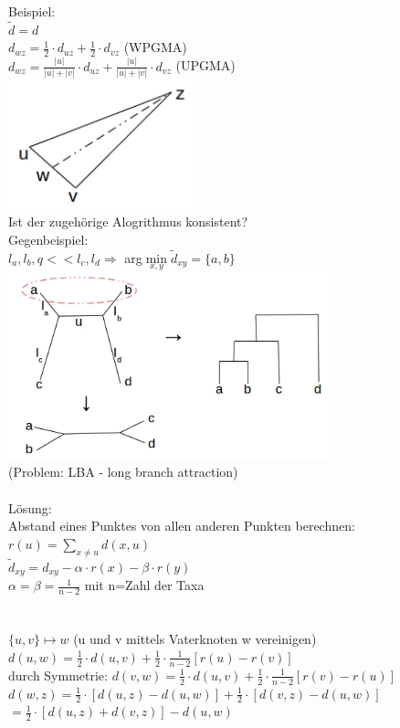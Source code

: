 Beispiel:\\
$\tilde d = d$\\
$d_{wz}=\frac{1}{2} \cdot d_{uz} + \frac{1}{2} \cdot d_{vz}$ (WPGMA)\\
$d_{wz}=\frac{|u|}{|u| + |v|} \cdot d_{uz} + \frac{|u|}{|u| + |v|} \cdot d_{vz}$ (UPGMA)\\
\includegraphics[width=0.4\textwidth]{lectures/161221/pix/2.jpg}\\
Ist der zugehörige Alogrithmus konsistent?\\
Gegenbeispiel:\\
$l_a,l_b,q << l_c,l_d \Rightarrow $ arg$\min \limits_{x,y} \tilde d_{xy}=\{a,b\}$\\
\includegraphics[width=0.7\textwidth]{lectures/161221/pix/3.jpg}\\
(Problem: LBA - long branch attraction)\\\\
Lösung:\\
Abstand eines Punktes von allen anderen Punkten berechnen:$r(u)=\displaystyle \sum_{x \neq u}d(x,u)$\\
$\tilde d_{xy}=d_{xy}-\alpha \cdot r(x) - \beta \cdot r(y)$\\
$\alpha = \beta = \frac{1}{n-2}$ mit n=Zahl der Taxa\\

\\\\
$\{u,v\} \mapsto w$ (u und v mittels Vaterknoten w vereinigen)\\
$d(u,w)=\frac{1}{2} \cdot d(u,v) + \frac{1}{2} \cdot \frac{1}{n-2}[r(u)-r(v)]$\\
durch Symmetrie:
$d(v,w)=\frac{1}{2} \cdot d(u,v) + \frac{1}{2} \cdot \frac{1}{n-2}[r(v)-r(u)]$\\
$d(w,z)=\frac{1}{2} \cdot [d(u,z) - d(u,w)] + \frac{1}{2} \cdot [d(v,z)-d(u,w)]$\\
$=\frac{1}{2} \cdot [d(u,z) + d(v,z)] - d(u,w)$\\

